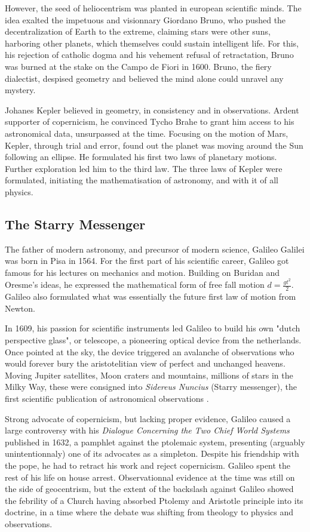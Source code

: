 However, the seed of heliocentrism was planted in european scientific minds. The idea exalted the impetuous and visionnary Giordano Bruno, who pushed the decentralization of Earth to the extreme, claiming stars were other suns, harboring other planets, which themselves could sustain intelligent life. For this, his rejection of catholic dogma and his vehement refusal of retractation, Bruno was burned at the stake on the Campo de Fiori in 1600. Bruno, the fiery dialectist, despised geometry and believed the mind alone could unravel any mystery. 

Johanes Kepler believed in geometry, in consistency and in observations. Ardent supporter of copernicism, he convinced Tycho Brahe to grant him access to his astronomical data, unsurpassed at the time. Focusing on the motion of Mars, Kepler, through trial and error, found out the planet was moving around the Sun following an ellipse. He formulated his first two laws of planetary motions. Further exploration led him to the third law. The three laws of Kepler were formulated, initiating the mathematisation of astronomy, and with it of all physics.

\subsection*{The Starry Messenger}


The father of modern astronomy, and precursor of modern science, Galileo Galilei was born in Pisa in 1564. For the first part of his scientific career, Galileo got famous for his lectures on mechanics and motion. Building on Buridan and Oresme's ideas, he expressed the mathematical form of free fall motion $ d = \frac{gt^2}{2}$. Galileo also formulated what was essentially the future first law of motion from Newton.

In 1609, his passion for scientific instruments led Galileo to build his own "dutch perspective glass", or telescope, a pioneering optical device from the netherlands. Once pointed at the sky, the device triggered an avalanche of observations who would forever bury the aristotelitian view of perfect and unchanged heavens. Moving Jupiter satellites, Moon craters and mountains, millions of stars in the Milky Way, these were consigned into \textit{Sidereus Nuncius} (Starry messenger), the first scientific publication of astronomical observations \citep{galileo1610}.

Strong advocate of copernicism, but lacking proper evidence, Galileo caused a large controversy with his 
\textit{Dialogue Concerning the Two Chief World Systems} published in 1632, a pamphlet against the ptolemaic system, presenting (arguably unintentionnaly) one of its advocates as a simpleton. Despite his friendship with the pope, he had to retract his work and reject copernicism. Galileo spent the rest of his life on house arrest. Observationnal evidence at the time was still on the side of geocentrism, but the extent of the backslash against Galileo showed the febrility of a Church having absorbed Ptolemy and Aristotle principle into its doctrine, in a time where the debate was shifting from theology to physics and observations.

